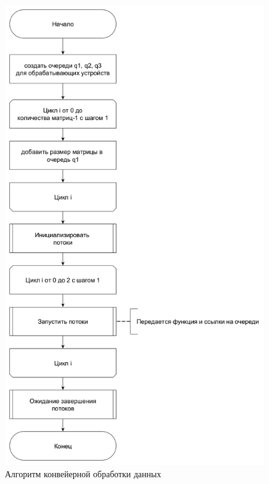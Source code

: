 \clearpage
\begin{figure}[h]
	\centering
	\includegraphics[height=0.8\textheight]{img/conveyor.png}
	\caption{Алгоритм конвейерной обработки данных}
    \label{fig:conveyor}
\end{figure}
